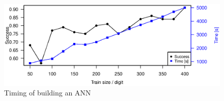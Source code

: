 \begin{figure}[h]
    \centering
    \includegraphics[width=\textwidth]{graphics/nn_timing_trainsize_200}
    \caption{Timing of building an ANN}
    \label{fig:nn_timing_trainsize}
\end{figure}
